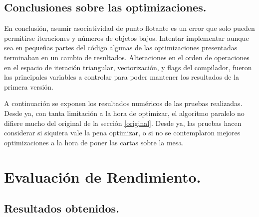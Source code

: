 \documentclass{article}
\begin{document}
\subsection{Conclusiones sobre las optimizaciones.}
En conclusión, asumir asociatividad de punto flotante es un error que solo pueden permitirse iteraciones
y números de objetos bajos. Intentar implementar aunque sea en pequeñas partes del código algunas de
las optimizaciones presentadas terminaban en un cambio de resultados. Alteraciones en el orden de operaciones
en el espacio de iteración triangular, vectorización, y flags del compilador, fueron las principales
variables a controlar para poder mantener los resultados de la primera versión.


A continuación se exponen los resultados numéricos de las pruebas realizadas.
Desde ya, con tanta limitación a la hora de optimizar, el algoritmo paralelo no difiere mucho del
original de la sección \ref{original}. Desde ya, las pruebas hacen considerar si siquiera vale
la pena optimizar, o si no se contemplaron mejores optimizaciones a la hora de poner las cartas sobre la mesa.


\section{Evaluación de Rendimiento.\label{performance}}
\subsection{Resultados obtenidos.}
\end{document}
